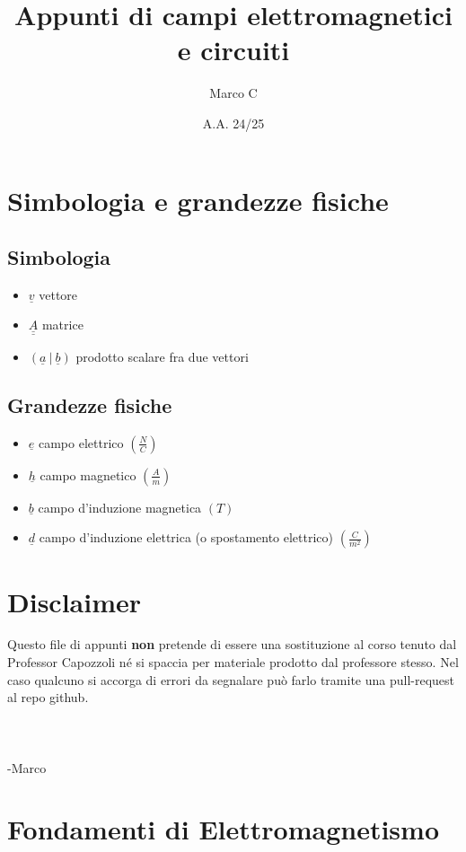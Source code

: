 \documentclass{book}
\title{Appunti di campi elettromagnetici e circuiti}
\author{Marco C}
\date{A.A. 24/25}
\begin{document}
\maketitle

\chapter*{Simbologia e grandezze fisiche}
    \section*{Simbologia}
    \begin{itemize}
        \item $\underline{v}$  vettore
        \item $\underline{\underline{A}}$ matrice
        \item $(\underline{a} \ | \ \underline{b})$ prodotto scalare fra due vettori
    \end{itemize}
    \section*{Grandezze fisiche}
    \begin{itemize}
        \item $\underline{e}$  campo elettrico $(\displaystyle \frac{N}{C})$
        \item $\underline{h}$  campo magnetico $(\displaystyle \frac{A}{m})$
        \item $\underline{b}$  campo d'induzione magnetica $(\displaystyle T)$
        \item $\underline{d}$  campo d'induzione elettrica (o spostamento elettrico) $(\displaystyle \frac{C}{m^{2}})$ 
    \end{itemize}
\chapter*{Disclaimer}
    Questo file di appunti \textbf{non} pretende di essere una sostituzione al corso tenuto dal Professor Capozzoli 
    né si spaccia per materiale prodotto dal professore stesso. Nel caso qualcuno si accorga di errori da segnalare può 
    farlo tramite una pull-request al repo github. \\ \\ \\ \\
    -Marco
\tableofcontents

\chapter{Fondamenti di Elettromagnetismo}
\end{document}
